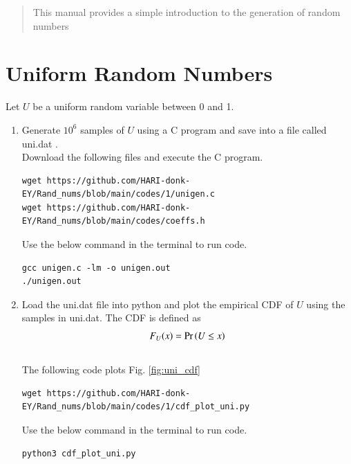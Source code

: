 \documentclass[journal,12pt,twocolumn]{IEEEtran}
\renewcommand\thesection{\arabic{section}}
\begin{document}
\bigskip

\renewcommand{\thefigure}{\theenumi}
\renewcommand{\thetable}{\theenumi}

\begin{abstract}
This manual provides a simple introduction to the generation of random numbers
\end{abstract}
\section{Uniform Random Numbers}
Let $U$ be a uniform random variable between 0 and 1.
\begin{enumerate}[label=\thesection.\arabic*
,ref=\thesection.\theenumi]

\item Generate $10^6$ samples of $U$ using a C program and save into a file called uni.dat .
\\
\solution Download the following files and execute the  C program.
\begin{lstlisting}
wget https://github.com/HARI-donk-EY/Rand_nums/blob/main/codes/1/unigen.c
wget https://github.com/HARI-donk-EY/Rand_nums/blob/main/codes/coeffs.h
\end{lstlisting}
Use the below command in the terminal to run code.
\begin{lstlisting}
gcc unigen.c -lm -o unigen.out
./unigen.out
\end{lstlisting}

%
\item
Load the uni.dat file into python and plot the empirical CDF of $U$ using the samples in uni.dat. The CDF is defined as
\begin{align}
F_{U}(x) = \Pr\left(U \le x\right)
\end{align}
\\
\solution  The following code plots Fig. \ref{fig:uni_cdf}
\begin{lstlisting}
wget https://github.com/HARI-donk-EY/Rand_nums/blob/main/codes/1/cdf_plot_uni.py
\end{lstlisting}
Use the below command in the terminal to run code.
\begin{lstlisting}
python3 cdf_plot_uni.py
\end{lstlisting}


\end{enumerate}
\end{document}
